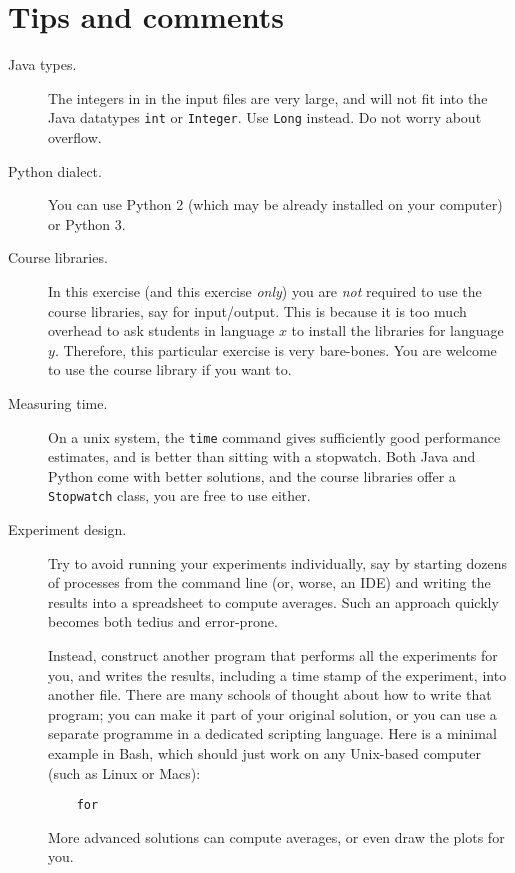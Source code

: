\documentclass{tufte-handout}
\begin{document}
\section{Tips and comments}

\begin{description}
  \item[Java types.] The integers in in the input files are very large, and will not fit into the Java datatypes \texttt{int} or \texttt{Integer}.
    Use \texttt{Long} instead.
    Do not worry about overflow.
  \item[Python dialect.] You can use Python 2 (which may be already installed on your computer) or Python 3.
  \item[Course libraries.]
    In this exercise (and this exercise \emph{only}) you are \emph{not} required to use the course libraries, say for input/output.
    This is because it is too much overhead to ask students in language $x$ to install the libraries for language $y$.
    Therefore, this particular exercise is very bare-bones.
    You are welcome to use the course library if you want to.
  \item[Measuring time.]
    On a unix system, the \texttt{time} command gives sufficiently good performance estimates, and is better than sitting with a stopwatch.
    Both Java and Python come with better solutions, and the course libraries offer a \texttt{Stopwatch} class, you are free to use either. 
  \item[Experiment design.]
    Try to avoid running your experiments individually, say by starting dozens of processes from the command line (or, worse, an IDE) and writing the results into a spreadsheet to compute averages.
    Such an approach quickly becomes both tedius and error-prone.

    Instead, construct another program that performs all the experiments for you, and writes the results, including a time stamp of the experiment, into another file.
    There are many schools of thought about how to write that program; you can make it part of your original solution, or you can use a separate programme in a dedicated scripting language.
    Here is a minimal example in Bash, which should just work on any Unix-based computer (such as Linux or Macs):
    \begin{lstlisting}
    for
    \end{lstlisting}
    More advanced solutions can compute averages, or even draw the plots for you.
\end{description}
\end{document}
